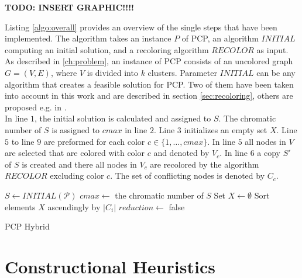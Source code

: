 \textbf{TODO: INSERT GRAPHIC!!!!}

Listing \ref{algo:overall} provides an overview of the single steps that have been implemented. The algorithm takes an instance $P$ of PCP, an algorithm $INITIAL$ computing an initial solution, and a recoloring algorithm $RECOLOR$ as input. As described in \ref{ch:problem}, an instance of PCP consists of an uncolored graph $G=(V,E)$, where $V$ is divided into $k$ clusters. Parameter $INITIAL$ can be any algorithm that creates a feasible solution for PCP. Two of them have been taken into account in this work and are described in section \ref{sec:recoloring}, others are proposed e.g. in \cite{li-00}.\\
In line $1$, the initial solution is calculated and assigned to $S$. The chromatic number of $S$ is assigned to $cmax$ in line $2$. Line $3$ initializes an empty set $X$. Line $5$ to line $9$ are preformed for each color $c \in \{1,\ldots , cmax\}$. In line $5$ all nodes in $V$ are selected that are colored with color $c$ and denoted by $V_c$. In line $6$ a copy $S'$ of $S$ is created and there all nodes in $V_c$ are recolored by the algorithm $RECOLOR$ excluding color $c$. The set of conflicting nodes is denoted by $C_c$.

\begin{algorithm}[h]
$S \gets INITIAL(\mathcal{P})$\;
$cmax \gets$ the chromatic number of $S$\;
Set $X \gets \emptyset $\;
Sort elements $X$ ascendingly by $|C_i|$\;
$reduction \gets$ false\;
\;
\caption{PCP Hybrid}
\label{algo:overall}
\end{algorithm}

\clearpage

\section{Constructional Heuristics}
\label{sec:construction}


